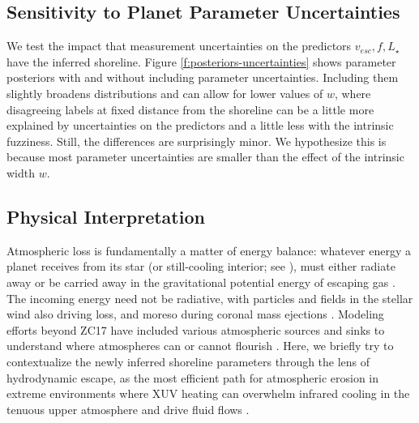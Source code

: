 \documentclass[modern,linenumbers,trackchanges]{aastex7}
\begin{document}
\subsection{Sensitivity to Planet Parameter Uncertainties}
We test the impact that measurement uncertainties on the predictors $v_{esc}, f, L_\star$ have the inferred shoreline. Figure \ref{f:posteriors-uncertainties} shows parameter posteriors with and without including parameter uncertainties. Including them slightly broadens distributions and can allow for lower values of $w$, where disagreeing labels at fixed distance from the shoreline can be a little more explained by uncertainties on the predictors and a little less with the intrinsic fuzziness. Still, the differences are surprisingly minor. We hypothesize this is because most parameter uncertainties are smaller than the effect of the intrinsic width $w$. 

\subsection{Physical Interpretation}
Atmospheric loss is fundamentally a matter of energy balance: whatever energy a planet receives from its star (or still-cooling interior; see \citealt{guptaSculptingValleyRadius2019}), must either radiate away or be carried away in the gravitational potential energy of escaping gas \citep{lewisPlanetsTheirAtmospheres1984, chamberlainTheoryPlanetaryAtmospheres1987}. The incoming energy need not be radiative, with particles and fields in the stellar wind also driving loss, and moreso during coronal mass ejections \citep{lammerCoronalMassEjection2007, jakoskyMAVENObservationsResponse2015}. Modeling efforts beyond ZC17 have included various atmospheric sources and sinks to understand where atmospheres can or cannot flourish \citep{tianTHERMALESCAPESUPER2009,
lugerHabitableEvaporatedCores2015, 
owenEvaporationValleyKepler2017, 
wyattSusceptibilityPlanetaryAtmospheres2020, 
guptaCaughtActCorepowered2021,
chatterjeeNovelPhysicsEscaping2024, 
chinRolePlanetaryRadius2024a, 
giallucaImplicationsThermalHydrodynamic2024,
teixeiraCarbondeficientEvolutionTRAPPIST1c2024,
zengCosmicHydrogenIce2024,
vanlooverenAiryWorldsBarren2024,
vanlooverenHabitableZoneAtmosphere2025, 
leeCarvingEdgesRocky2025,
jiCosmicShorelineRevisited2025}. Here, we briefly try to contextualize the newly inferred shoreline parameters through the lens of hydrodynamic escape, as the most efficient path for atmospheric erosion in extreme environments where XUV heating can overwhelm infrared cooling in the tenuous upper atmosphere and drive fluid flows \citep{sekiyaDissipationRareGases1980, watsonDynamicsRapidlyEscaping1981}. 
\end{document}
